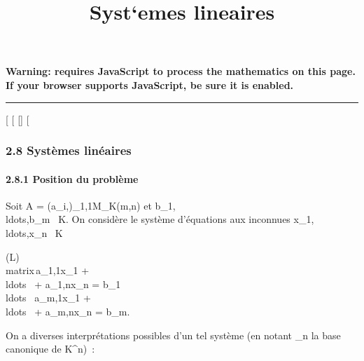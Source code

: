 \documentclass[]{article}
\title{Syst`emes lineaires}
\author{}
\date{}
\begin{document}
\maketitle

\textbf{Warning: 
requires JavaScript to process the mathematics on this page.\\ If your
browser supports JavaScript, be sure it is enabled.}

\begin{center}\rule{3in}{0.4pt}\end{center}

{[}
{[}
{[}{]}
{[}

\subsubsection{2.8 Systèmes linéaires}

\paragraph{2.8.1 Position du problème}

Soit A = (a\_i,\jmath)\_1\leqi\leqm,1\leq\jmath\leqn \in M\_K(m,n) et
b\_1,\\ldots,b\_m~
\in K. On considère le système d'équations aux inconnues
x\_1,\\ldots,x\_n~
\in K

(L)\quad \left
\\matrix\,a\_1,1x\_1
+ \\ldots~ +
a\_1,nx\_n = b\_1 \cr
\\ldots~
\cr a\_m,1x\_1 +
\\ldots~ +
a\_m,nx\_n = b\_m\right .

On a diverses interprétations possibles d'un tel système (en notant
\textCan\_n la base canonique de
K^n)~:
\end{document}
